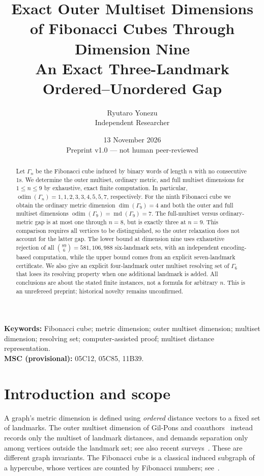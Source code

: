 \documentclass[10pt,a4paper]{article}
\title{Exact Outer Multiset Dimensions of Fibonacci Cubes Through Dimension Nine\\[2mm]
\large An Exact Three-Landmark Ordered--Unordered Gap}
\author{Ryutaro Yonezu\\\small Independent Researcher}
\date{13 November 2026\\\small Preprint v1.0 --- not human peer-reviewed}
\newcommand{\odim}{\operatorname{odim}}
\newcommand{\md}{\operatorname{md}}
\newcommand{\G}{\Gamma}
\begin{document}
\maketitle
\begin{abstract}
Let $\G_n$ be the Fibonacci cube induced by binary words of length $n$ with no consecutive $1$s.
We determine the outer multiset, ordinary metric, and full multiset dimensions
for $1\leq n\leq9$ by exhaustive, exact finite computation.
In particular, $\odim(\G_n)=1,1,2,3,3,4,5,5,7$, respectively.
For the ninth Fibonacci cube we obtain the ordinary metric dimension $\dim(\G_9)=4$
and both the outer and full multiset dimensions $\odim(\G_9)=\md(\G_9)=7$.
The full-multiset versus ordinary-metric gap is at most one through $n=8$,
but is exactly three at $n=9$. This comparison requires all vertices to be
distinguished, so the outer relaxation does not account for the latter gap.
The lower bound at dimension nine uses exhaustive rejection of all
$\binom{89}{6}=581{,}106{,}988$ six-landmark sets, with an independent encoding-based computation,
while the upper bound comes from an explicit seven-landmark certificate.
We also give an explicit four-landmark outer multiset resolving set of $\G_6$ that loses
its resolving property when one additional landmark is added.
All conclusions are about the stated finite instances, not a formula for arbitrary $n$.
This is an unrefereed preprint; historical novelty remains unconfirmed.
\end{abstract}
\noindent\textbf{Keywords:} Fibonacci cube; metric dimension; outer multiset dimension; multiset dimension; resolving set; computer-assisted proof; multiset distance representation.\\
\textbf{MSC (provisional):} 05C12, 05C85, 11B39.

\section{Introduction and scope}
A graph's metric dimension is defined using \emph{ordered} distance vectors to a fixed set of landmarks.
The outer multiset dimension of Gil-Pons and coauthors~\cite{GilPons2019}
instead records only the multiset of landmark distances, and demands separation only
among vertices outside the landmark set; see also recent surveys~\cite{Farhan2026,Albejani2026}.
These are different graph invariants. The Fibonacci cube is a classical induced subgraph of a hypercube,
whose vertices are counted by Fibonacci numbers; see~\cite{Klavzar2013,Cabello2011}.
\end{document}
